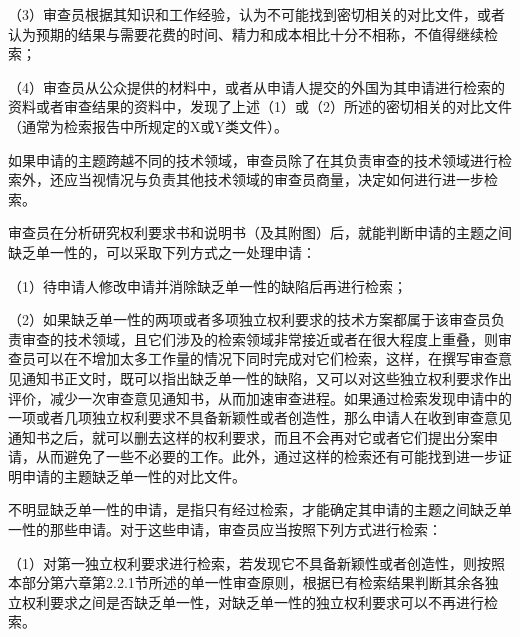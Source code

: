 {\setlength{\parindent}{17.1bp}（3）审查员根据其知识和工作经验，认为不可能找到密切相关的对比文件，或者认为预期的结果与需要花费的时间、精力和成本相比十分不相称，不值得继续检索；\par}

{\setlength{\parindent}{17.1bp}（4）审查员从公众提供的材料中，或者从申请人提交的外国为其申请进行检索的资料或者审查结果的资料中，发现了上述（1）或（2）所述的密切相关的对比文件（通常为检索报告中所规定的X或Y类文件）。\par}

如果申请的主题跨越不同的技术领域，审查员除了在其负责审查的技术领域进行检索外，还应当视情况与负责其他技术领域的审查员商量，决定如何进行进一步检索。

审查员在分析研究权利要求书和说明书（及其附图）后，就能判断申请的主题之间缺乏单一性的，可以采取下列方式之一处理申请：

{\setlength{\parindent}{17.1bp}（1）待申请人修改申请并消除缺乏单一性的缺陷后再进行检索；\par}

{\setlength{\parindent}{17.1bp}（2）如果缺乏单一性的两项或者多项独立权利要求的技术方案都属于该审查员负责审查的技术领域，且它们涉及的检索领域非常接近或者在很大程度上重叠，则审查员可以在不增加太多工作量的情况下同时完成对它们检索，这样，在撰写审查意见通知书正文时，既可以指出缺乏单一性的缺陷，又可以对这些独立权利要求作出评价，减少一次审查意见通知书，从而加速审查进程。如果通过检索发现申请中的一项或者几项独立权利要求不具备新颖性或者创造性，那么申请人在收到审查意见通知书之后，就可以删去这样的权利要求，而且不会再对它或者它们提出分案申请，从而避免了一些不必要的工作。此外，通过这样的检索还有可能找到进一步证明申请的主题缺乏单一性的对比文件。\par}

不明显缺乏单一性的申请，是指只有经过检索，才能确定其申请的主题之间缺乏单一性的那些申请。对于这些申请，审查员应当按照下列方式进行检索：

{\setlength{\parindent}{17.1bp}（1）对第一独立权利要求进行检索，若发现它不具备新颖性或者创造性，则按照本部分第六章第2.2.1节所述的单一性审查原则，根据已有检索结果判断其余各独立权利要求之间是否缺乏单一性，对缺乏单一性的独立权利要求可以不再进行检索。\par}

